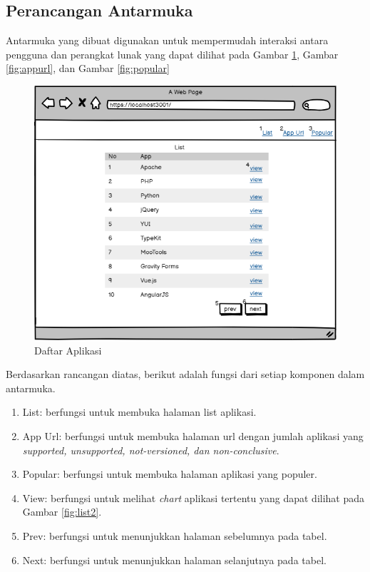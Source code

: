 \subsection{Perancangan Antarmuka}
Antarmuka yang dibuat digunakan untuk mempermudah interaksi antara pengguna dan perangkat lunak yang dapat dilihat pada Gambar \ref{fig:list1}, Gambar \ref{fig:appurl}, dan Gambar \ref{fig:popular}
\begin{figure}[H]
	\centering  
	\includegraphics[scale=0.7]{Gambar/list1.png}  
	\caption{Daftar Aplikasi} 
	\label{fig:list1} 
\end{figure}
Berdasarkan rancangan diatas, berikut adalah fungsi dari setiap komponen dalam antarmuka.
\begin{enumerate}
	\item List: berfungsi untuk membuka halaman list aplikasi.
	\item App Url: berfungsi untuk membuka halaman url dengan jumlah aplikasi yang \textit{supported, unsupported, not-versioned, dan non-conclusive}.
	\item Popular: berfungsi untuk membuka halaman aplikasi yang populer.
	\item View: berfungsi untuk melihat \textit{chart} aplikasi tertentu yang dapat dilihat pada Gambar \ref{fig:list2}.
	\item Prev: berfungsi untuk menunjukkan halaman sebelumnya pada tabel.
	\item Next: berfungsi untuk menunjukkan halaman selanjutnya pada tabel. 
\end{enumerate}

